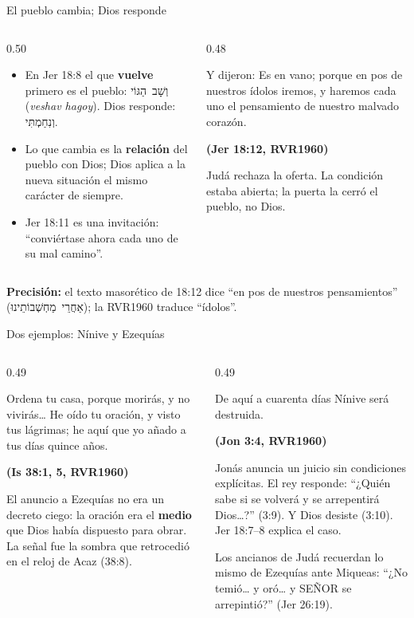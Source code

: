 \documentclass[hyperref={bookmarks=false},aspectratio=169]{beamer}
\newcommand{\heb}[1]{\mbox{\foreignlanguage{hebrew}{#1}}}
\newcommand{\SENOR}{S{\fontsize{0.78em}{1em}\selectfont EÑOR}}
\newcommand{\fuente}[1]{\par\hfill{\upshape\bfseries\footnotesize\textcolor{azul}{#1}}}
\newcommand{\destacar}[1]{\textbf{\textcolor{azul}{#1}}}
\newcommand{\precision}[1]{{\footnotesize\color{gris}\textbf{Precisión:} #1}}
\begin{document}
\begin{frame}{El pueblo cambia; Dios responde}
\begin{columns}[t,onlytextwidth]
\begin{column}{0.50\textwidth}\small
\begin{itemize}
\item En Jer 18:8 el que \destacar{vuelve} primero es el pueblo: \heb{וְשָׁב הַגּוֹי} (\emph{veshav hagoy}). Dios responde: \heb{וְנִחַמְתִּי}.
\item Lo que cambia es la \destacar{relación} del pueblo con Dios; Dios aplica a la nueva situación el mismo carácter de siempre.
\item Jer 18:11 es una invitación: ``conviértase ahora cada uno de su mal camino''.
\end{itemize}
\end{column}
\begin{column}{0.48\textwidth}
\begin{cita}Y dijeron: Es en vano; porque en pos de nuestros ídolos iremos, y haremos cada uno el pensamiento de nuestro malvado corazón.\fuente{(Jer 18:12, RVR1960)}\end{cita}
\small Judá rechaza la oferta. La condición estaba abierta; la puerta la cerró el pueblo, no Dios.
\end{column}
\end{columns}\par\smallskip
\precision{el texto masorético de 18:12 dice ``en pos de nuestros pensamientos'' (\heb{אַחֲרֵי מַחְשְׁבוֹתֵינוּ}); la RVR1960 traduce ``ídolos''.}
\end{frame}

\begin{frame}{Dos ejemplos: Nínive y Ezequías}
\begin{columns}[t,onlytextwidth]
\begin{column}{0.49\textwidth}
\begin{cita}Ordena tu casa, porque morirás, y no vivirás\ldots{} He oído tu oración, y visto tus lágrimas; he aquí que yo añado a tus días quince años.\fuente{(Is 38:1, 5, RVR1960)}\end{cita}
\scriptsize El anuncio a Ezequías no era un decreto ciego: la oración era el \destacar{medio} que Dios había dispuesto para obrar. La señal fue la sombra que retrocedió en el reloj de Acaz (38:8).
\end{column}
\begin{column}{0.49\textwidth}
\begin{cita}De aquí a cuarenta días Nínive será destruida.\fuente{(Jon 3:4, RVR1960)}\end{cita}
\scriptsize Jonás anuncia un juicio sin condiciones explícitas. El rey responde: ``¿Quién sabe si se volverá y se arrepentirá Dios\ldots?'' (3:9). Y Dios desiste (3:10). Jer 18:7--8 explica el caso.\par\smallskip
Los ancianos de Judá recuerdan lo mismo de Ezequías ante Miqueas: ``¿No temió\ldots{} y oró\ldots{} y \SENOR{} se arrepintió?'' (Jer 26:19).
\end{column}
\end{columns}
\end{frame}
\end{document}
